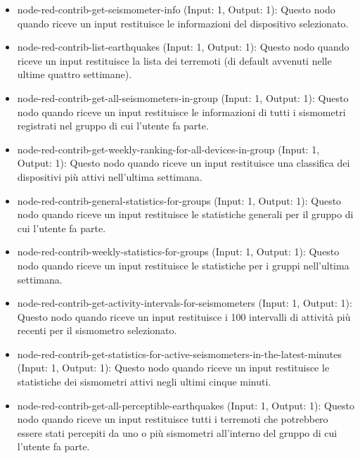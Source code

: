 \documentclass[a4paper,10pt]{memoir}
\begin{document}
\begin{itemize}
    \item node-red-contrib-get-seismometer-info (Input: 1, Output: 1): Questo nodo quando riceve un input restituisce le informazioni del dispositivo selezionato.
    \item node-red-contrib-list-earthquakes (Input: 1, Output: 1): Questo nodo quando riceve un input restituisce la lista dei terremoti (di default avvenuti nelle ultime quattro settimane).
    \item node-red-contrib-get-all-seismometers-in-group (Input: 1, Output: 1): Questo nodo quando riceve un input restituisce le informazioni di tutti i sismometri registrati nel gruppo di cui l'utente fa parte. 
    \item node-red-contrib-get-weekly-ranking-for-all-devices-in-group (Input: 1, Output: 1): Questo nodo quando riceve un input restituisce una classifica dei dispositivi più attivi nell'ultima settimana.
    \item node-red-contrib-general-statistics-for-groups (Input: 1, Output: 1): Questo nodo quando riceve un input restituisce le statistiche generali per il gruppo di cui l'utente fa parte.
    \item node-red-contrib-weekly-statistics-for-groups (Input: 1, Output: 1): Questo nodo quando riceve un input restituisce le statistiche per i gruppi nell'ultima settimana.
    \item node-red-contrib-get-activity-intervals-for-seismometers (Input: 1, Output: 1): Questo nodo quando riceve un input restituisce i 100 intervalli di attività più recenti per il sismometro selezionato.
    \item node-red-contrib-get-statistics-for-active-seismometers-in-the-latest-minutes (Input: 1, Output: 1): Questo nodo quando riceve un input restituisce le statistiche dei sismometri attivi negli ultimi cinque minuti.
    \item node-red-contrib-get-all-perceptible-earthquakes (Input: 1, Output: 1): Questo nodo quando riceve un input restituisce tutti i terremoti che potrebbero essere stati percepiti da uno o più sismometri all'interno del gruppo di cui l'utente fa parte.
\end{itemize}
\end{document}
